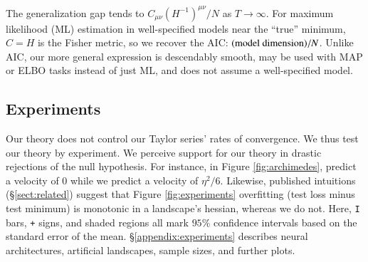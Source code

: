             The generalization gap tends  
            to $C_{\mu\nu}(H^{-1})^{\mu\nu}/N$ as $T\to\infty$.  For maximum
            likelihood (ML) estimation in well-specified models near the ``true''
            minimum, $C=H$ is the Fisher metric, so we recover the AIC:
            $(\textnormal{model dimension})/N$.  Unlike AIC, our more general
            expression is descendably smooth, may be used with MAP or ELBO tasks
            instead of just ML, and does not assume a well-specified model.

    \subsection{Experiments}
        Our theory does not control our Taylor series' rates of convergence. 
        We thus test our theory by experiment.  We perceive support for our
        theory in drastic rejections of the null hypothesis.  For instance, in
        Figure \ref{fig:archimedes}, \cite{ch18} predict a velocity of
        $0$ while we predict a velocity of $\eta^2/6$.  Likewise, published
        intuitions (\S\ref{sect:related}) suggest that Figure
        \ref{fig:experiments} overfitting (test loss minus test
        minimum) is monotonic in a landscape's hessian, whereas we do not.
        Here, \texttt{I} bars, \texttt{+} signs, and shaded regions all mark
        $95\%$ confidence intervals based on the standard error of the mean.
        \S\ref{appendix:experiments} describes neural architectures, artificial
        landscapes, sample sizes, and further plots.

